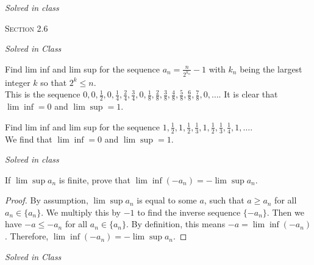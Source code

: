 \documentclass[12pt]{article}
\newenvironment{exercise}[2][Exercise]{\begin{trivlist}
\item[\hskip \labelsep {\bfseries #1}\hskip \labelsep {\bfseries #2.}]}{\end{trivlist}}
\begin{document}
\begin{exercise}{2.5.10}
\emph{Solved in class}
\end{exercise}

\begin{center}
\textsc{\Large Section 2.6}
\end{center}

\begin{exercise}{2.6.1}
\emph{Solved in Class}
\end{exercise}

\begin{exercise}{2.6.2}
Find lim inf and lim sup for the sequence $a_n = \frac{n}{2^{k_n}}-1$ with $k_n$ being the largest integer $k$ so that $2^k \leq n$. \\

This is the sequence $0, 0, \frac{1}{2},0, \frac{1}{4}, \frac{2}{4}, \frac{3}{4}, 0, \frac{1}{8}, \frac{2}{8}, \frac{3}{8}, \frac{4}{8}, \frac{5}{8}, \frac{6}{8}, \frac{7}{8}, 0, \hdots $. It is clear that $\lim \inf =0$ and $\lim \sup = 1$. 
\end{exercise}


\begin{exercise}{2.6.3}
Find lim inf and lim sup for the sequence $1, \frac{1}{2}, 1,\frac{1}{2},\frac{1}{3},1,\frac{1}{2},\frac{1}{3}, \frac{1}{4},1,\hdots$. \\

We find that $\lim \inf = 0$ and $\lim \sup =1$.
\end{exercise}


\begin{exercise}{2.6.4}
\emph{Solved in class}
\end{exercise}

\begin{exercise}{2.6.5}
If $\lim \sup a_n$ is finite, prove that $\lim \inf(-a_n) = - \lim \sup a_n$.
	
	\begin{proof}
	By assumption, $\lim \sup a_n$ is equal to some $a$, such that $a \geq a_n$ for all $a_n \in \{a_n\}$. We multiply this by $-1$ to find the inverse sequence $\{-a_n\}$. Then we have $-a \leq -a_n$ for all $a_n \in \{a_n\}$. By definition, this means $-a = \lim \inf (-a_n)$. Therefore, $\lim \inf (-a_n) = - \lim \sup a_n$.
	\end{proof}
\end{exercise}


\begin{exercise}{2.6.7}
\emph{Solved in Class}
\end{exercise}
\end{document}
